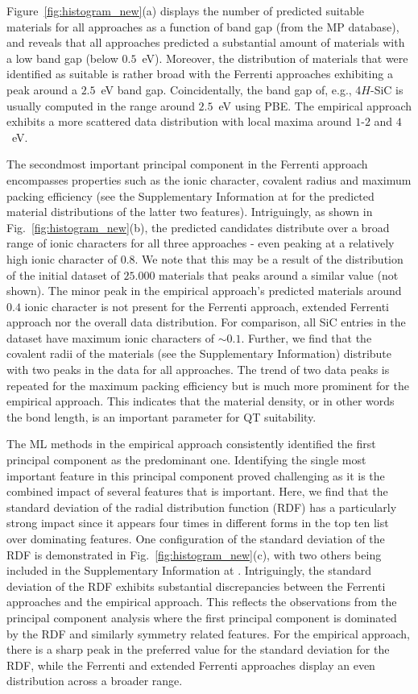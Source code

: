 \documentclass[superscriptaddress,unsortedaddress,
 amsmath,amssymb,
 aps,
]{revtex4-2}
\begin{document}
Figure~\ref{fig:histogram_new}(a) displays the number of predicted suitable materials for all approaches as a function of band gap (from the MP database), and reveals that all approaches predicted a substantial amount of materials with a low band gap (below $0.5$~eV). Moreover, the distribution of materials that were identified as suitable is rather broad with the Ferrenti approaches exhibiting a peak around a $2.5$~eV band gap. 
Coincidentally, the band gap of, e.g., 4$H$-SiC is usually computed in the range around $2.5$~eV using PBE. 
The empirical approach exhibits a more scattered data distribution with local maxima around $1$-$2$ and $4$~eV. 

The secondmost important principal component in the Ferrenti approach encompasses properties such as the ionic character, covalent radius and maximum packing efficiency (see the Supplementary Information at \cite{supplementary} for the predicted material distributions of the latter two features).  
Intriguingly, as shown in Fig.~\ref{fig:histogram_new}(b), the predicted candidates distribute over a broad range of ionic characters for all three approaches - even peaking at a relatively high ionic character of $0.8$. 
We note that this may be a result of the distribution of the initial dataset of $25.000$ materials that peaks around a similar value (not shown). The minor peak in the empirical approach's predicted materials around $0.4$ ionic character is not present for the Ferrenti approach, extended Ferrenti approach nor the overall data distribution. For comparison, all SiC entries in the dataset have maximum ionic characters of $\sim 0.1$. 
Further, we find that the covalent radii of the materials (see the Supplementary Information) distribute with two peaks in the data for all approaches. 
The trend of two data peaks is repeated for the maximum packing efficiency but is much more prominent for the empirical approach. This indicates that the material density, or in other words the bond length, is an important parameter for QT suitability.  

The ML methods in the empirical approach consistently identified the first principal component as the predominant one. Identifying the single most important feature in this principal component proved challenging as it is the combined impact of several features that is important. 
Here, we find that the standard deviation of the radial distribution function (RDF) has a  particularly strong impact since it appears four times in different forms in the top ten list over dominating features. One configuration of the standard deviation of the RDF is demonstrated in Fig.~\ref{fig:histogram_new}(c), with two others being included in the Supplementary Information at \cite{supplementary}. Intriguingly, the standard deviation of the RDF exhibits substantial discrepancies between the Ferrenti approaches and the empirical approach. This reflects the observations from the principal component analysis where the first principal component is dominated by the RDF and similarly symmetry related features. For the empirical approach, there is a sharp peak in the preferred value for the standard deviation for the RDF, while the Ferrenti and extended Ferrenti approaches display an even distribution across a broader range. 
\end{document}
